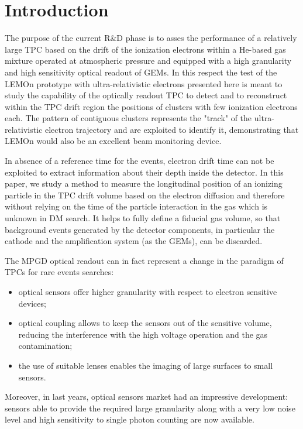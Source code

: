 \documentclass[%
 aip,
 amsmath,amssymb,
 reprint,%
]{revtex4-1}
\begin{document}
\section{Introduction}
The purpose of the current R\&D phase is to asses the performance  of a relatively large TPC based on the drift of the  ionization electrons   within a He-based gas mixture operated at atmospheric pressure and  equipped with a high granularity and high sensitivity optical readout of GEMs. In this respect the test of the LEMOn prototype  with ultra-relativistic electrons presented here  is meant to study the capability of the optically readout TPC to detect   and to reconstruct within the TPC drift region  the positions of clusters with few  ionization electrons each. The pattern of contiguous clusters represents the "track" of the ultra-relativistic electron trajectory and are exploited to  identify  it,  demonstrating that LEMOn  would also be an excellent beam monitoring device.

 In absence of a reference time for the events, electron drift time can not be exploited to extract information about their depth inside the detector. In this paper, we study a method to measure the  longitudinal position of an ionizing particle in the TPC drift volume based on the electron diffusion and therefore without relying on the time of the particle interaction in the gas which is unknown in DM search. It helps  to fully define a fiducial gas volume, so that background events  generated by the detector components, in particular the cathode and the amplification system (as the GEMs), can  be discarded.
 
The MPGD optical readout can in fact  represent a change in the paradigm of TPCs for rare events searches:
\begin{itemize}
\item optical sensors offer higher granularity with respect to electron sensitive devices;
\item optical coupling allows to keep the sensors out of the sensitive volume, reducing the interference with the high
voltage operation and  the gas contamination;
\item the use of suitable lenses enables the imaging of  large surfaces to small sensors.
\end{itemize}
Moreover, in last years, optical sensors market had an impressive development: sensors able to provide the required large granularity along with a very low noise level and high sensitivity to single photon counting are now available.
\end{document}
